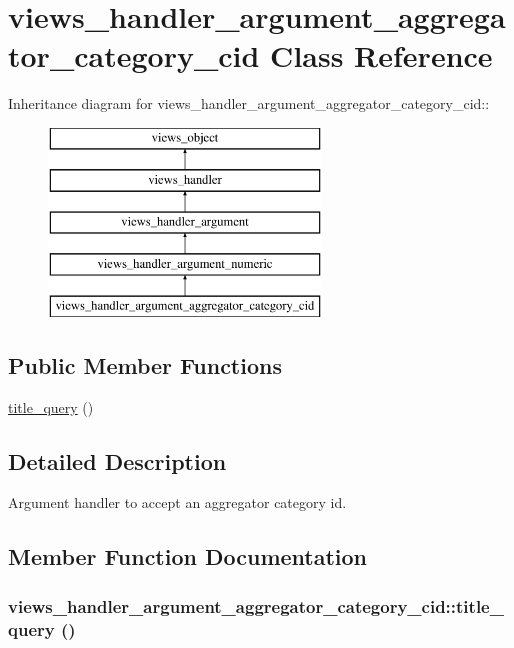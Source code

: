 \hypertarget{classviews__handler__argument__aggregator__category__cid}{
\section{views\_\-handler\_\-argument\_\-aggregator\_\-category\_\-cid Class Reference}
\label{classviews__handler__argument__aggregator__category__cid}
}
Inheritance diagram for views\_\-handler\_\-argument\_\-aggregator\_\-category\_\-cid::\begin{figure}[H]
\begin{center}
\leavevmode
\includegraphics[height=5cm]{classviews__handler__argument__aggregator__category__cid}
\end{center}
\end{figure}
\subsection*{Public Member Functions}
\begin{CompactItemize}
\item 
\hyperlink{classviews__handler__argument__aggregator__category__cid_aaf79328b4ec709281563e275f9a7df2}{title\_\-query} ()
\end{CompactItemize}


\subsection{Detailed Description}
Argument handler to accept an aggregator category id. 

\subsection{Member Function Documentation}
\hypertarget{classviews__handler__argument__aggregator__category__cid_aaf79328b4ec709281563e275f9a7df2}{
\subsubsection[{title\_\-query}]{\setlength{\rightskip}{0pt plus 5cm}views\_\-handler\_\-argument\_\-aggregator\_\-category\_\-cid::title\_\-query ()}}
\label{classviews__handler__argument__aggregator__category__cid_aaf79328b4ec709281563e275f9a7df2}


